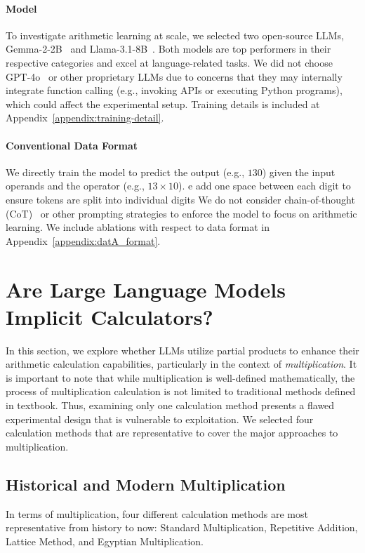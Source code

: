 \documentclass[11pt]{article}
\begin{document}
\paragraph{Model}
To investigate arithmetic learning at scale, we selected two open-source LLMs, Gemma-2-2B~\citep{gemmateam2024gemma2improvingopen} and Llama-3.1-8B~\citep{dubey2024llama3herdmodels}. Both models are top performers in their respective categories and excel at language-related tasks. We did not choose  GPT-4o~\citep{openai2024gpt4technicalreport} or other proprietary LLMs due to concerns that they may internally integrate function calling (e.g., invoking APIs or executing Python programs), which could affect the experimental setup. Training details is included at Appendix~\ref{appendix:training-detail}.

\paragraph{Conventional Data Format}
We directly train the model to predict the output (e.g., $130$) given the input operands and the operator (e.g., $13 \times 10$). e add one space between each digit to ensure tokens are split into individual digits We do not consider chain-of-thought (CoT)~\citep{wei2023chainofthoughtpromptingelicitsreasoning} or other prompting strategies to enforce the model to focus on arithmetic learning. We include ablations with respect to data format in Appendix~\ref{appendix:datA_format}.

\section{Are Large Language Models Implicit Calculators?}
In this section, we explore whether LLMs utilize partial products to enhance their arithmetic calculation capabilities, particularly in the context of \textit{multiplication}. It is important to note that while multiplication is well-defined mathematically, the process of multiplication calculation is not limited to traditional methods defined in textbook. Thus, examining only one calculation method presents a flawed experimental design that is vulnerable to exploitation. We selected four calculation methods that are representative to cover the major approaches to multiplication.
\subsection{Historical and Modern Multiplication}
\label{sec:his_mod_multi}
In terms of multiplication, four different calculation methods are most representative from history to now: Standard Multiplication, Repetitive Addition, Lattice Method, 
and Egyptian Multiplication.
\end{document}
